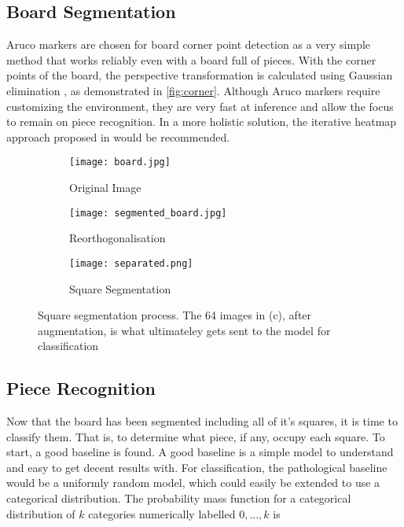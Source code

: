 \subsection{Board Segmentation}
Aruco markers are chosen for board corner point detection as a very simple method that works reliably even with a board full of pieces.
With the corner points of the board, the perspective transformation is calculated using
Gaussian elimination \cite{gauss}, as demonstrated in \autoref{fig:corner}.
Although Aruco markers require customizing the environment, they are very fast at 
inference and allow the focus to remain on piece recognition.  In a more holistic solution, the 
iterative heatmap approach proposed in \cite{heatmap} would be recommended.

\begin{figure}[h]
    \centering
    \begin{subfigure}[b]{0.32\textwidth}
        \centering
        \texttt{[image: board.jpg]}
        \caption{Original Image}
    \end{subfigure}
    \hfill
    \begin{subfigure}[b]{0.32\textwidth}
        \centering
        \texttt{[image: segmented\_board.jpg]}
        \caption{Reorthogonalisation}
    \end{subfigure}
    \hfill
    \begin{subfigure}[b]{0.32\textwidth}
        \centering
        \texttt{[image: separated.png]}
        \caption{Square Segmentation}
    \end{subfigure}
\caption{Square segmentation process.  The 64 images in (c), after augmentation, is what ultimateley gets sent to the model for classification}
\label{fig:corner}
\end{figure}
    

\subsection{Piece Recognition}
Now that the board has been segmented including all of it's squares, it is time to classify them.  That is,
to determine what piece, if any, occupy each square.  To start, a good baseline is found.  
A good baseline is a simple model to understand and easy to get decent results with.
For classification, the pathological baseline would be a uniformly random model, which could easily be extended to use a categorical distribution.
The probability mass function for a categorical distribution of $k$ categories numerically labelled $0, ..., k$ is

